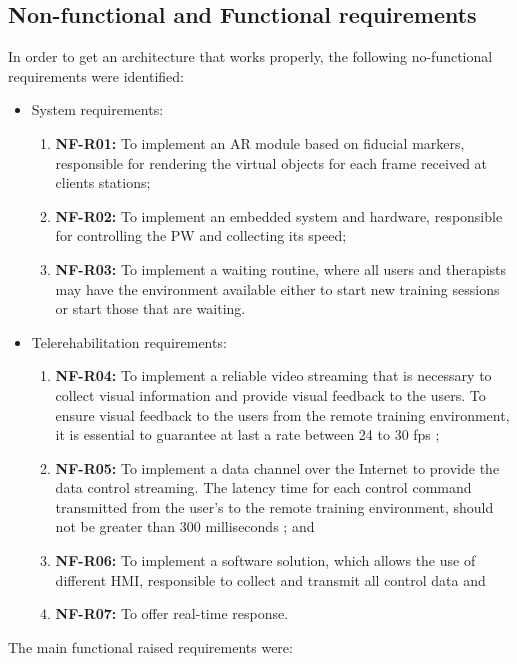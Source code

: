 \subsection{Non-functional and Functional requirements}
\label{sec:funciotionarq}

In order to get an architecture that works properly, the following no-functional requirements were identified:


\begin{itemize}
\item System requirements:
\begin{enumerate}
\item \textbf{NF-R01:} To implement an AR module based on fiducial markers, responsible for rendering the virtual objects for each frame received at clients stations;
\item \textbf{NF-R02:} To implement an embedded system and hardware, responsible for controlling the PW and collecting its speed;
\item \textbf{NF-R03:} To implement a waiting routine, where all users and therapists may have the environment available either to start new training sessions or start those that are waiting.
\end{enumerate}
\item Telerehabilitation requirements: 
\begin{enumerate}
\item \textbf{NF-R04:} To implement a reliable video streaming that is necessary to collect visual information and provide visual feedback to the users. To ensure visual feedback to the users from the remote training environment, it is essential to guarantee at last a rate between 24 to 30 fps \cite{chouiten2012};
\item \textbf{NF-R05:} To implement a data channel over the Internet to provide the data control streaming. The latency time for each control command transmitted from the user's to the remote training environment, should not be greater than 300 milliseconds \cite{chu2006}; and
\item \textbf{NF-R06:} To implement a software solution, which allows the use of different HMI, responsible to collect and transmit all control data and
\item \textbf{NF-R07:} To offer real-time response.

\end{enumerate} 
\end{itemize}

The main functional raised requirements were:


